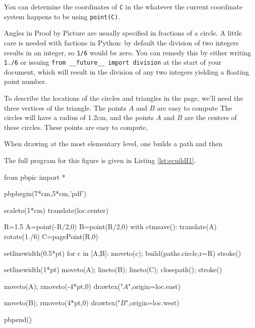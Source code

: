 \documentclass[12pt]{article}
\def\code#1{{\tt #1}}
\begin{document}
You
can determine the coordinates of \code{C} in the whatever the current
coordinate system happens to be using \code{point(C)}.

Angles in Proof by Picture
are usually specified in fractions of a circle.  A little care is needed
with factions in Python: by default the division of two integers results
in an integer, so \code{1/6} would be zero.  You can remedy this by
either writing \code{1./6} or issuing \code{from \_\_future\_\_ import division}
at the start of your document, which will result in the division of
any two integers yielding a floating point number. 

 
To describe the locations of the circles and triangles in the page, we'll 
need the three vertices of the triangle.  The points $A$ and $B$ are easy
to compute
The circles will have a radius
of 1.2cm, and the points $A$ and $B$ are the centers of these circles.
These points are easy to compute, 

When drawing at
the most elementary level, one builds a path and then 



The full program for this figure is given in Listing \ref{lst:ecuildI1}.

\begin{snippet}
from pbpic import *

pbpbegin(7*cm,5*cm,'pdf')

scaleto(1*cm)
translate(loc.center)

R=1.5
A=point(-R/2,0)
B=point(R/2,0)
with ctmsave():
  translate(A)
  rotate(1./6)
  C=pagePoint(R,0)

setlinewidth(0.5*pt)
for c in [A,B]:
  moveto(c); build(paths.circle,r=R)
  stroke()

setlinewidth(1*pt)
moveto(A); lineto(B); lineto(C); closepath();
stroke()

moveto(A); rmoveto(-4*pt,0)
drawtex("$A$",origin=loc.east)

moveto(B); rmoveto(4*pt,0)
drawtex("$B$",origin=loc.west)

pbpend()
\end{snippet}
\end{document}
